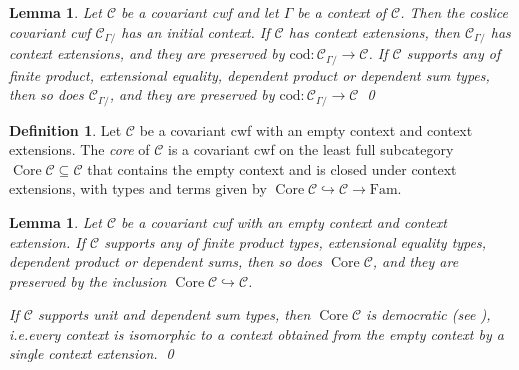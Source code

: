 \documentclass[a4paper]{article}
\newtheorem{lemma}[theorem]{Lemma}
\theoremstyle{remark}
\theoremstyle{definition}
\newtheorem{definition}[theorem]{Definition}
\begin{document}
\begin{lemma}
  \label{lem:coslice-cwf}
  Let $\mathcal{C}$ be a covariant cwf and let $\Gamma$ be a context of $\mathcal{C}$.
  Then the coslice covariant cwf $\mathcal{C}_{\Gamma /}$ has an initial context.
  If $\mathcal{C}$ has context extensions, then $\mathcal{C}_{\Gamma /}$ has context extensions, and they are preserved by $\mathrm{cod} : \mathcal{C}_{\Gamma /} \rightarrow \mathcal{C}$.
  If $\mathcal{C}$ supports any of finite product, extensional equality, dependent product or dependent sum types, then so does $\mathcal{C}_{\Gamma /}$, and they are preserved by $\mathrm{cod} : \mathcal{C}_{\Gamma /} \rightarrow \mathcal{C}$
  \qed
\end{lemma}

\begin{definition}
  Let $\mathcal{C}$ be a covariant cwf with an empty context and context extensions.
  The \emph{core} of $\mathcal{C}$ is a covariant cwf on the least full subcategory $\operatorname{Core} \mathcal{C} \subseteq \mathcal{C}$ that contains the empty context and is closed under context extensions, with types and terms given by $\operatorname{Core} \mathcal{C} \hookrightarrow \mathcal{C} \rightarrow \mathrm{Fam}$.
\end{definition}

\begin{lemma}
  \label{lem:core-cwf}
  Let $\mathcal{C}$ be a covariant cwf with an empty context and context extension.
  If $\mathcal{C}$ supports any of finite product types, extensional equality types, dependent product or dependent sums, then so does $\operatorname{Core} \mathcal{C}$, and they are preserved by the inclusion $\operatorname{Core} \mathcal{C} \hookrightarrow \mathcal{C}$.

  If $\mathcal{C}$ supports unit and dependent sum types, then $\operatorname{Core} \mathcal{C}$ is democratic (see \cite{biequivalence-lcc-cwf}), i.e.\@ every context is isomorphic to a context obtained from the empty context by a single context extension.
  \qed
\end{lemma}
\end{document}
